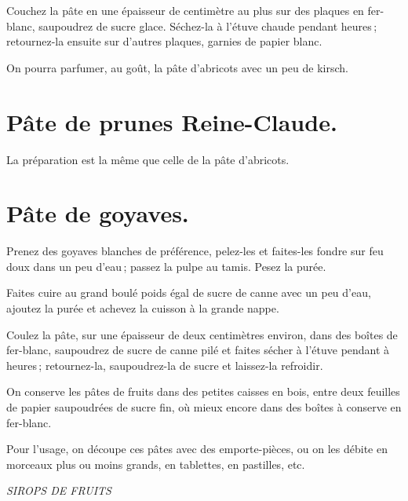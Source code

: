 Couchez la pâte en une épaisseur de {\mmm} centimètre au plus sur des
plaques en fer-blanc, saupoudrez de sucre glace. Séchez-la à l'étuve chaude
pendant {\mmm} heures ; retournez-la ensuite sur d'autres plaques,
garnies de papier blanc.

\medskip

On pourra parfumer, au goût, la pâte d'abricots avec un peu de kirsch.

\section*{\centering Pâte de prunes Reine-Claude.}
{}

La préparation est la même que celle de la pâte d'abricots.

\section*{\centering Pâte de goyaves.}
{}

Prenez des goyaves blanches de préférence, pelez-les et faites-les fondre sur
feu doux dans un peu d’eau ; passez la pulpe au tamis. Pesez la purée.

Faites cuire au grand boulé poids égal de sucre de canne avec un peu d'eau,
ajoutez la purée et achevez la cuisson à la grande nappe.

Coulez la pâte, sur une épaisseur de deux centimètres environ, dans des boîtes
de fer-blanc, saupoudrez de sucre de canne pilé et faites sécher à l’étuve
pendant {\mmm} à {\mmm} heures ; retournez-la, saupoudrez-la de
sucre et laissez-la refroidir.

\sk

On conserve les pâtes de fruits dans des petites caisses en bois, entre deux
feuilles de papier saupoudrées de sucre fin, où mieux encore dans des boîtes
à conserve en fer-blanc.

\medskip

Pour l'usage, on découpe ces pâtes avec des emporte-pièces, ou on les débite en
morceaux plus ou moins grands, en tablettes, en pastilles, etc.

\bigskip

\begin{center}
\textit{SIROPS DE FRUITS}
\end{center}

